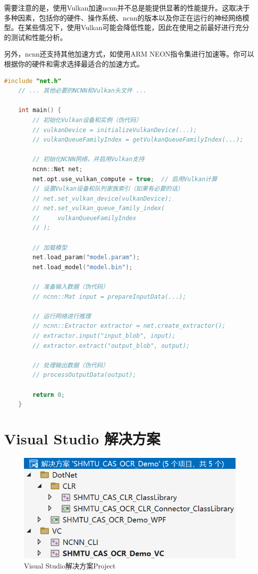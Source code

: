需要注意的是，使用Vulkan加速ncnn并不总是能提供显著的性能提升。这取决于多种因素，包括你的硬件、操作系统、ncnn的版本以及你正在运行的神经网络模型。在某些情况下，使用Vulkan可能会降低性能，因此在使用之前最好进行充分的测试和性能分析。

另外，ncnn还支持其他加速方式，如使用ARM NEON指令集进行加速等。你可以根据你的硬件和需求选择最适合的加速方式。

\begin{lstlisting}[caption={NCNN with Vulkan Initialization}, language=C++]
	#include "net.h"
	// ... 其他必要的NCNN和Vulkan头文件 ...

	int main() {
		// 初始化Vulkan设备和实例（伪代码）
		// vulkanDevice = initializeVulkanDevice(...);
		// vulkanQueueFamilyIndex = getVulkanQueueFamilyIndex(...);

		// 初始化NCNN网络，并启用Vulkan支持
		ncnn::Net net;
		net.opt.use_vulkan_compute = true;  // 启用Vulkan计算
		// 设置Vulkan设备和队列家族索引（如果有必要的话）
		// net.set_vulkan_device(vulkanDevice);
		// net.set_vulkan_queue_family_index(
		//     vulkanQueueFamilyIndex
		// );

		// 加载模型
		net.load_param("model.param");
		net.load_model("model.bin");

		// 准备输入数据（伪代码）
		// ncnn::Mat input = prepareInputData(...);

		// 运行网络进行推理
		// ncnn::Extractor extractor = net.create_extractor();
		// extractor.input("input_blob", input);
		// extractor.extract("output_blob", output);

		// 处理输出数据（伪代码）
		// processOutputData(output);

		return 0;
	}
\end{lstlisting}

\section{Visual Studio 解决方案}

\begin{figure}
	\centering
	\includegraphics[width=0.7\linewidth]{Resources/Picture/vs}
	\caption{Visual Studio解决方案Project}
	\label{fig:vs}
\end{figure}

